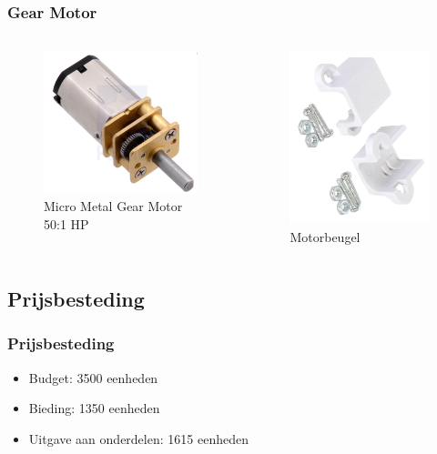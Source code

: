 \documentclass[aspectratio=169,kulak,t]{kulakbeamer} %
\begin{document}
\begin{frame}
	\frametitle{Gear Motor}
	\begin{columns}
		\begin{figure}
			\centering
			\includegraphics[width=.6\textwidth]{gear}
			\caption{Micro Metal Gear Motor 50:1 HP}
		\end{figure}
		\begin{figure}
			\centering
			\includegraphics[width=.7\textwidth]{beugel}
			\caption{Motorbeugel}
		\end{figure}
	\end{columns}
	
\end{frame}



\subsection{Prijsbesteding}
\begin{frame}
	\frametitle{Prijsbesteding}
	\begin{itemize}
		\item Budget: 3500 eenheden
		\item Bieding: 1350 eenheden
		\item Uitgave aan onderdelen: 1615 eenheden
	\end{itemize}
\end{frame}
\end{document}
